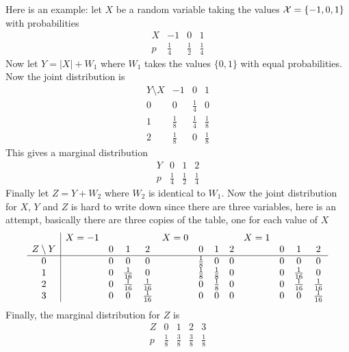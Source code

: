 \documentclass[12pt]{article}
\begin{document}
Here is an example: let $X$ be a random variable taking the values
${\cal X}=\{-1,0,1\}$ with probabilities
\begin{equation}
\begin{array}{c|ccc}
X&-1&0&1\\
\hline
p&\frac{1}{4}&\frac{1}{2}&\frac{1}{4}
\end{array}
\end{equation}
Now let $Y=|X|+W_1$ where $W_1$ takes the values $\{0,1\}$ with equal probabilities. Now the joint distribution is
\begin{equation}
\begin{array}{c|ccc}
Y\setminus X&-1&0&1\\
\hline
0&0          &\frac{1}{4}&0           \\
1&\frac{1}{8}&\frac{1}{4}&\frac{1}{8} \\
2&\frac{1}{8}&0          &\frac{1}{8}
\end{array}
\end{equation}
This gives a marginal distribution
\begin{equation}
\begin{array}{c|ccc}
Y&0&1&2\\
\hline
p&\frac{1}{4}&\frac{1}{2}&\frac{1}{4}
\end{array}
\end{equation}
Finally let $Z=Y+W_2$ where $W_2$ is identical to $W_1$. Now the joint distribution for $X$, $Y$ and $Z$ is hard to write down since there are three variables, here is an attempt, basically there are three copies of the table, one for each value of $X$
\begin{equation}
\begin{array}{c|c ccc c ccc c ccc}
&X=-1&&&&X=0&&&&X=1&&&\\
Z\setminus Y&&0&1&2&&0&1&2&&0&1&2\\
\hline
0&&0&0&0         &&\frac{1}{8}&0&0&&0&0&0\\
1&&0&\frac{1}{16}&0&&\frac{1}{8}&\frac{1}{8}&0&&0&\frac{1}{16}&0\\
2&&0&\frac{1}{16}&\frac{1}{16}&&0&\frac{1}{8}&0&&0&\frac{1}{16}&\frac{1}{16}\\
3&&0&0&\frac{1}{16}&&0&0&0&&0&0&\frac{1}{16}
\end{array}
\end{equation}
Finally, the marginal distribution for $Z$ is
\begin{equation}
\begin{array}{c|cccc}
Z&0&1&2&3\\
\hline
p&\frac{1}{8}&\frac{3}{8}&\frac{3}{8}&\frac{1}{8}
\end{array}
\end{equation}
\end{document}

